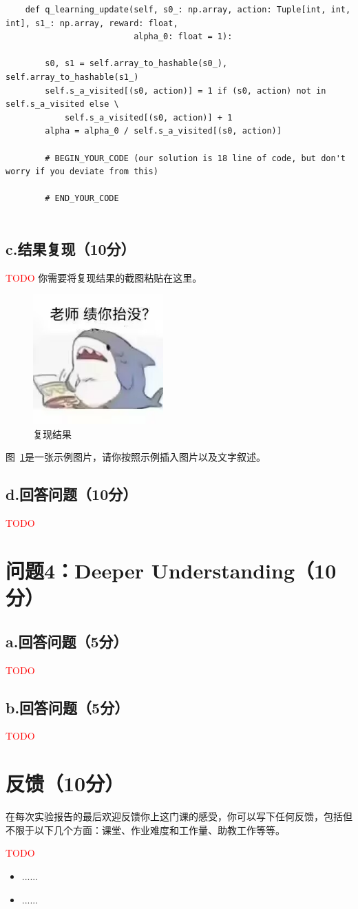 \documentclass{article}
\begin{document}
\begin{lstlisting}
    def q_learning_update(self, s0_: np.array, action: Tuple[int, int, int], s1_: np.array, reward: float,
                          alpha_0: float = 1):

        s0, s1 = self.array_to_hashable(s0_), self.array_to_hashable(s1_)
        self.s_a_visited[(s0, action)] = 1 if (s0, action) not in self.s_a_visited else \
            self.s_a_visited[(s0, action)] + 1
        alpha = alpha_0 / self.s_a_visited[(s0, action)]

        # BEGIN_YOUR_CODE (our solution is 18 line of code, but don't worry if you deviate from this)
        
        # END_YOUR_CODE


\end{lstlisting}



\subsection*{c.结果复现（10分）}
\textcolor{red}{TODO}
你需要将复现结果的截图粘贴在这里。
\begin{figure}[H]
    \centering
    \includegraphics[width=5cm]{pics/temp.jpg}
    \caption{复现结果}
    \label{fig:indesirable_solution}
\end{figure}
图~\ref{fig:indesirable_solution}是一张示例图片，请你按照示例插入图片以及文字叙述。

\subsection*{d.回答问题（10分）}
\textcolor{red}{TODO}

\section*{问题4：Deeper Understanding（10分）}
\subsection*{a.回答问题（5分）}
\textcolor{red}{TODO}

\subsection*{b.回答问题（5分）}
\textcolor{red}{TODO}


\section*{反馈（10分）}
在每次实验报告的最后欢迎反馈你上这门课的感受，你可以写下任何反馈，包括但不限于以下几个方面：课堂、作业难度和工作量、助教工作等等。

\textcolor{red}{TODO} %
\begin{itemize}
    \item ......
    \item ......
\end{itemize}
\end{document}
